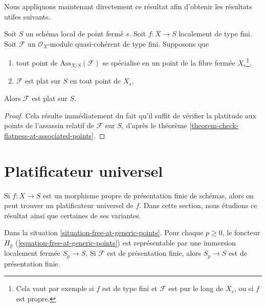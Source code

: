 \noindent
Nous appliquons maintenant directement ce résultat afin d'obtenir les résultats utiles suivants.

\begin{lemma}
\label{lemma-check-along-closed-fibre}
Soit $S$ un schéma local de point fermé $s$.
Soit $f : X \to S$ localement de type fini.
Soit $\mathcal{F}$ un $\mathcal{O}_X$-module quasi-cohérent de type fini.
Supposons que
\begin{enumerate}
\item tout point de $\text{Ass}_{X/S}(\mathcal{F})$ se spécialise
en un point de la fibre fermée $X_s$\footnote{Cela vaut par exemple si
$f$ est de type fini et $\mathcal{F}$ est pur le long de $X_s$, ou
si $f$ est propre.},
\item $\mathcal{F}$ est plat sur $S$ en tout point de $X_s$.
\end{enumerate}
Alors $\mathcal{F}$ est plat sur $S$.
\end{lemma}

\begin{proof}
Cela résulte immédiatement du fait qu'il suffit de vérifier la
platitude aux points de l'assassin relatif de $\mathcal{F}$
sur $S$, d'après le
théorème \ref{theorem-check-flatness-at-associated-points}.
\end{proof}











\section{Platificateur universel}
\label{section-flattening-final}

\noindent
Si $f : X \to S$ est un morphisme propre de présentation finie
de schémas, alors on peut trouver un platificateur universel de $f$.
Dans cette section, nous étudions ce résultat ainsi que certaines de ses variantes.

\begin{lemma}
\label{lemma-free-at-generic-points-representable}
Dans la situation \ref{situation-free-at-generic-points}.
Pour chaque $p \geq 0$, le foncteur $H_p$
(\ref{equation-free-at-generic-points}) est représentable
par une immersion localement fermée $S_p \to S$. Si $\mathcal{F}$
est de présentation finie, alors $S_p \to S$ est de présentation finie.
\end{lemma}

